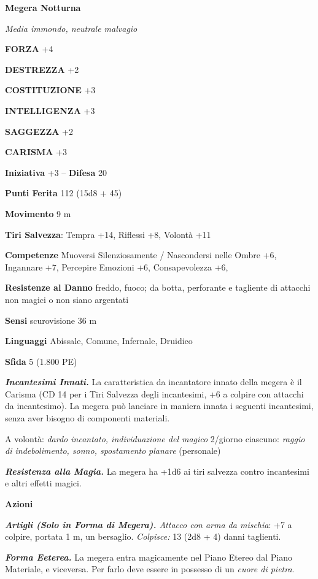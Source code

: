 \begin{multicols}{2}
\medskip{}\textbf{Megera Notturna}

\emph{Media immondo, neutrale malvagio}

\textbf{FORZA} +4

\textbf{DESTREZZA} +2

\textbf{COSTITUZIONE} +3

\textbf{INTELLIGENZA} +3

\textbf{SAGGEZZA} +2

\textbf{CARISMA} +3

\textbf{Iniziativa} +3 -- \textbf{Difesa} 20

\textbf{Punti Ferita} 112 (15d8 + 45)

\textbf{Movimento} 9 m

\textbf{Tiri Salvezza}: Tempra +14, Riflessi +8, Volontà +11

\textbf{Competenze} Muoversi Silenziosamente / Nascondersi nelle Ombre +6, Ingannare +7, Percepire Emozioni +6, Consapevolezza +6,

\textbf{Resistenze al Danno} freddo, fuoco; da botta, perforante e tagliente di attacchi non magici o non siano argentati

\textbf{Sensi} scurovisione 36 m

\textbf{Linguaggi} Abissale, Comune, Infernale, Druidico

\textbf{Sfida} 5 (1.800 PE)

\emph{\textbf{Incantesimi Innati.}} La caratteristica da incantatore
innato della megera è il Carisma (CD 14 per i Tiri Salvezza degli
incantesimi, +6 a colpire con attacchi da incantesimo). La megera può
lanciare in maniera innata i seguenti incantesimi, senza aver bisogno di
componenti materiali.

A volontà: \emph{dardo incantato, individuazione del magico} 2/giorno
ciascuno: \emph{raggio di indebolimento, sonno, spostamento}
\emph{planare} (personale)

\emph{\textbf{Resistenza alla Magia.}} La megera ha +1d6 ai tiri
salvezza contro incantesimi e altri effetti magici.

\textbf{Azioni}

\emph{\textbf{Artigli (Solo in Forma di Megera).} Attacco con arma da
	mischia}: +7 a colpire, portata 1 m, un bersaglio. \emph{Colpisce:} 13
(2d8 + 4) danni taglienti.

\emph{\textbf{Forma Eeterea.}} La megera entra magicamente nel Piano
Etereo dal Piano Materiale, e viceversa. Per farlo deve essere in
possesso di un \emph{cuore di pietra}.


\end{multicols}
